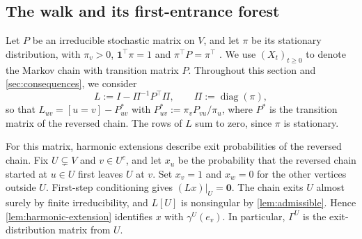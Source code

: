 \documentclass[onefignum,onetabnum]{siamart250211}
\numberwithin{theorem}{section}
\numberwithin{equation}{section}
\newcommand{\one}{\mathbf{1}}
\newcommand{\zero}{\mathbf{0}}
\DeclareMathOperator{\diag}{diag}
\begin{document}
\subsection{The walk and its first-entrance forest}\label{sec:walkdef}

Let $P$ be an irreducible stochastic matrix on $V$, and let $\pi$ be
its stationary distribution, with $\pi_v>0$, $\one^{\top}\pi=1$ and
$\pi^{\top}P=\pi^{\top}$ \cite[Ch.~1]{LevinPeres2017}. We use
$(X_t)_{t\ge0}$ to denote the Markov chain with transition matrix $P$.
Throughout this section and \cref{sec:consequences}, we consider
\begin{equation}\label{eq:Ldef}
L:=I-\Pi^{-1}P^{\top}\Pi,\qquad \Pi:=\diag(\pi),
\end{equation}
so that $L_{uv}=[u=v]-P^{*}_{uv}$ with $P^{*}_{uv}:=\pi_vP_{vu}/\pi_u$,
where $P^{*}$ is the transition matrix of the reversed chain. The rows
of $L$ sum to zero, since $\pi$ is stationary.

For this matrix, harmonic extensions describe exit probabilities of
the reversed chain. Fix $U\subsetneq V$ and $v\in U^c$, and let $x_u$
be the probability that the reversed chain started at $u\in U$ first
leaves $U$ at $v$. Set $x_v=1$ and $x_w=0$ for the other vertices
outside $U$. First-step conditioning gives $(Lx)|_U=\zero$.
The chain exits $U$ almost surely by finite irreducibility, and
$L[U]$ is nonsingular by \cref{lem:admissible}. Hence
\cref{lem:harmonic-extension} identifies $x$ with $\gamma^U(e_v)$.
In particular, $\Gamma^U$ is the exit-distribution matrix from $U$.
\end{document}
